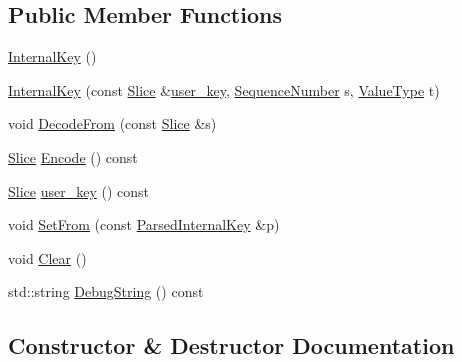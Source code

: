 \subsection*{Public Member Functions}
\begin{DoxyCompactItemize}
\item 
\mbox{\hyperlink{classleveldb_1_1_internal_key_a277b997aadb14d0a65314187a1e6adf6}{Internal\+Key}} ()
\item 
\mbox{\hyperlink{classleveldb_1_1_internal_key_af436814d1667db55e93b6bd583619617}{Internal\+Key}} (const \mbox{\hyperlink{classleveldb_1_1_slice}{Slice}} \&\mbox{\hyperlink{classleveldb_1_1_internal_key_a9673dbb181eaa977e6f09c45b02938bc}{user\+\_\+key}}, \mbox{\hyperlink{namespaceleveldb_a5481ededd221c36d652c371249f869fa}{Sequence\+Number}} s, \mbox{\hyperlink{namespaceleveldb_acc038cb0d608414730cafa459a4ba866}{Value\+Type}} t)
\item 
void \mbox{\hyperlink{classleveldb_1_1_internal_key_a5a8c9bced0ba968b6b62d91cfb19a82a}{Decode\+From}} (const \mbox{\hyperlink{classleveldb_1_1_slice}{Slice}} \&s)
\item 
\mbox{\hyperlink{classleveldb_1_1_slice}{Slice}} \mbox{\hyperlink{classleveldb_1_1_internal_key_a0cb2fdabc879bdbe7afc3ba12152384c}{Encode}} () const
\item 
\mbox{\hyperlink{classleveldb_1_1_slice}{Slice}} \mbox{\hyperlink{classleveldb_1_1_internal_key_a9673dbb181eaa977e6f09c45b02938bc}{user\+\_\+key}} () const
\item 
void \mbox{\hyperlink{classleveldb_1_1_internal_key_ada9566cd92b6b9784ab7f2f6f71d0a4e}{Set\+From}} (const \mbox{\hyperlink{structleveldb_1_1_parsed_internal_key}{Parsed\+Internal\+Key}} \&p)
\item 
void \mbox{\hyperlink{classleveldb_1_1_internal_key_ab6e9ebec1bf567de89d8dd34fdc51f86}{Clear}} ()
\item 
std\+::string \mbox{\hyperlink{classleveldb_1_1_internal_key_ad5812d3c90842906266e50b5a5911f84}{Debug\+String}} () const
\end{DoxyCompactItemize}


\subsection{Constructor \& Destructor Documentation}
\mbox{\label{classleveldb_1_1_internal_key_a277b997aadb14d0a65314187a1e6adf6}} 

